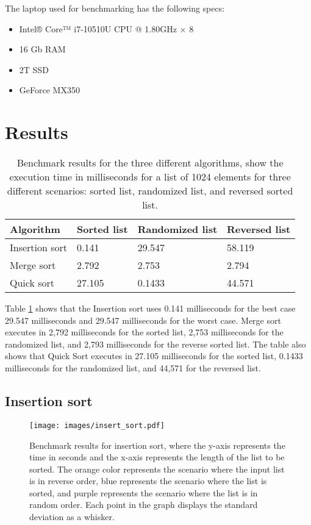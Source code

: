 \documentclass[sigconf, nonacm, natbib, screen, balance=False, 9.5pt]{acmart}
\begin{document}
The laptop used for benchmarking has the following specs:
\begin{itemize}
\item Intel® Core™ i7-10510U CPU @ 1.80GHz × 8
\item 16 Gb RAM
\item 2T SSD
\item GeForce MX350
\end{itemize}


\section{Results}\label{sec:results}
\begin{table}
  \caption{Benchmark results for the three different algorithms, show the execution time in milliseconds for a list of 1024 elements for three different scenarios: sorted list, randomized list, and reversed sorted list.}
  \label{tab:time}
  \begin{tabular}{llll}
    \hline
    Algorithm & Sorted list & Randomized list& Reversed list\\\hline
    Insertion sort & 0.141 & 29.547 & 58.119  \\
    Merge sort & 2.792 & 2.753 & 2.794  \\
    Quick sort & 27.105 & 0.1433 & 44.571 \\\hline
  \end{tabular}

\end{table}
Table \ref{tab:time} shows that the Insertion sort uses 0.141 milliseconds for the best case 29.547 milliseconds and 29.547 milliseconds for the worst case. Merge sort executes in 2,792 milliseconds for the sorted list, 2,753 milliseconds for the randomized list, and 2,793 milliseconds for the reverse sorted list. The table also shows that Quick Sort executes in 27.105 milliseconds for the sorted list, 0.1433 milliseconds for the randomized list, and 44,571 for the reversed list. 

\subsection{Insertion sort}


\begin{figure}[htp]%
  \centering
  \texttt{[image: images/insert\_sort.pdf]}
  \caption{Benchmark results for insertion sort, where the y-axis represents the time in seconds and the x-axis represents the length of the list to be sorted. The orange color represents the scenario where the input list is in reverse order, blue represents the scenario where the list is sorted, and purple represents the scenario where the list is in random order. Each point in the graph displays the standard deviation as a whisker.}
  \label{fig:bench_insertion}
\end{figure}
\end{document}
